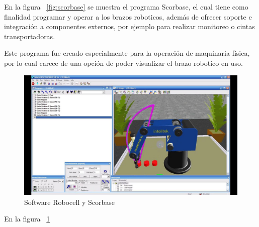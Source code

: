 \begin{enumerate}[label=\arabic*.-]
En la figura ~\ref{fig:scorbase} se muestra el programa Scorbase, el cual tiene como finalidad programar y operar a los brazos roboticos, además de ofrecer soporte e integración a componentes externos, por ejemplo para realizar monitoreo o cintas transportadoras.

Este programa fue creado especialmente para la operación de maquinaria física, por lo cual carece de una opción de poder visualizar el brazo robotico en uso. 

\begin{figure}[h]
\centering
\includegraphics[width=13cm]{figures/robocell scorbase.jpg}
\caption{Software Robocell y Scorbase}
\label{fig:robobase}
\end{figure}

En la figura ~\ref{fig:robobase}




\end{enumerate}